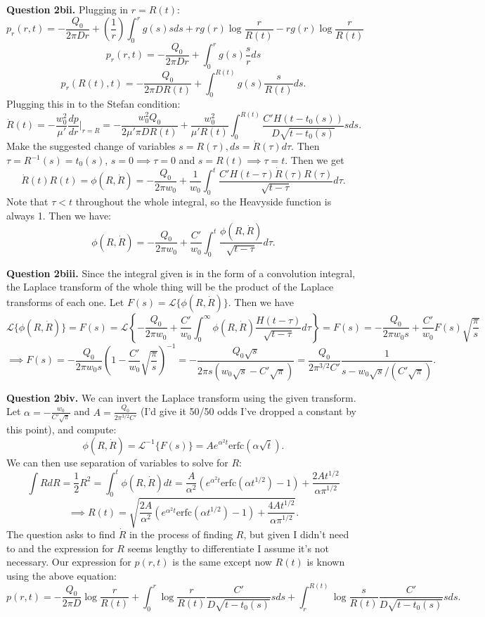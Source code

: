 \documentclass[letterpaper, reqno,11pt]{article}
\begin{document}
{\medskip\noindent\bf Question 2bii.} Plugging in $r=R(t)$:
\[
  p_r(r,t)=-\frac{Q_0}{2\pi Dr}+\left( \frac{1}{r} \right) \int_{0}^{r}g(s)sds+rg(r)\log \frac{r}{R(t)}-rg(r)\log \frac{r}{R(t)}
\]
\[
  p_r(r,t)=-\frac{Q_0}{2\pi Dr}+ \int_{0}^{r}g(s)\frac{s}{r}ds
\]
\[
  p_r(R(t),t)=-\frac{Q_0}{2\pi DR(t)}+ \int_{0}^{R(t)}g(s)\frac{s}{R(t)}ds
.\]
Plugging this in to the Stefan condition:
\[
\dot R(t)=-\frac{w_0^2}{\mu'}\frac{dp}{dr}\bigg|_{r=R}=-\frac{w_0^2Q_0}{2\mu'\pi DR(t)}+ \frac{w_0^2}{\mu'R(t)}\int_{0}^{R(t)}\frac{C'H(t-t_0(s))}{D\sqrt{t-t_0(s)}}sds
.\]
Make the suggested change of variables $s=R(\tau),ds=\dot R(\tau) d\tau$. Then $\tau=R^{-1}(s)=t_0(s)$, $s=0\implies \tau =0$ and $s=R(t)\implies \tau=t$. Then we get
\[
\dot R(t)R(t)=\phi(R,\dot R)=-\frac{Q_0}{2\pi w_0}+\frac{1}{w_0}\int_0^{t}\frac{C' H(t-\tau)\dot R(\tau)R(\tau)}{\sqrt{t-\tau}}d\tau
.\]
Note that $\tau<t$ throughout the whole integral, so the Heavyside function is always 1. Then we have:
\[
\phi(R,\dot R)=-\frac{Q_0}{2 \pi w_0}+\frac{C'}{w_0}\int_0^{t} \frac{\phi(R,\dot R)}{\sqrt{t-\tau}}d\tau
.\]

{\medskip\noindent\bf Question 2biii.} Since the integral given is in the form of a convolution integral, the Laplace transform of the whole thing will be the product of the Laplace transforms of each one. Let $F(s)=\mathcal L \{\phi(R,\dot R)\}$. Then we have
\[
\mathcal L \{\phi(R,\dot R)\}=F(s)=\mathcal L \left\{-\frac{Q_0}{2 \pi w_0}+\frac{C'}{w_0}\int_0^{\infty} \phi(R,\dot R)\frac{H(t-\tau)}{\sqrt{t-\tau}}d\tau\right\}= F(s)=-\frac{Q_0}{2\pi w_0 s}+\frac{C'}{w_0}F(s) \sqrt{\frac{\pi}{s}}
\]
\[
  \implies F(s)=- \frac{Q_0}{2\pi w_0s}\left( 1-\frac{C'}{w_0}\sqrt{\frac{\pi}{s}} \right)^{-1}=-\frac{Q_0\sqrt{s}}{2\pi s(w_0\sqrt{s}-C'\sqrt{\pi})}= \frac{Q_0}{2\pi^{3 /2} C'}\frac{1}{s-w_0 \sqrt{s} /(C'\sqrt{ \pi})}
.\]

{\medskip\noindent\bf Question 2biv.} We can invert the Laplace transform using the given transform. Let $\alpha=-\frac{w_0}{C'\sqrt{\pi}}$ and $A=\frac{Q_0}{2\pi^{3 /2}C'}$ (I'd give it 50/50 odds I've dropped a constant by this point), and compute:
\[
  \phi(R,\dot R)=\mathcal L^{-1}\{F(s)\}=Ae^{\alpha^2 t}\text{erfc}\left( \alpha \sqrt{t} \right)
.\]
We can then use separation of variables to solve for $R$:
\[
\int RdR=\frac{1}{2}R^2=\int_0^{t} \phi(R,\dot R)dt=\frac{A}{\alpha^2}\left( e^{\alpha^2t}\text{erfc}\left( \alpha t ^{1 /2} \right) -1 \right) +\frac{2At ^{1 /2}}{\alpha \pi^{1 /2}}
\]
\[
  \implies R(t)=\sqrt{\frac{2A}{\alpha^2}\left( e^{\alpha^2t}\text{erfc}\left( \alpha t ^{1 /2} \right) -1 \right) +\frac{4At ^{1 /2}}{\alpha \pi^{1 /2}}}
.\]
The question asks to find $\dot R$ in the process of finding $R$, but given I didn't need to and the expression for $R$ seems lengthy to differentiate I assume it's not necessary. Our expression for $p(r,t)$ is the same except now $R(t)$ is known using the above equation:
\[
p(r,t)=-\frac{Q_0}{2\pi D}\log \frac{r}{R(t)}+\int_0^{r}\log \frac{r}{R(t)}\frac{C'}{D\sqrt{t-t_0(s)}}sds+\int_r^{R(t)}\log \frac{s}{R(t)}\frac{C'}{D\sqrt{t-t_0(s)}}sds
.\]
\end{document}
